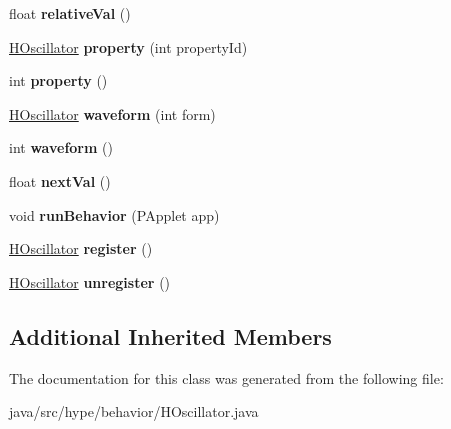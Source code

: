 \begin{DoxyCompactItemize}
\item 
\hypertarget{classhype_1_1behavior_1_1_h_oscillator_ace36b4ea82a7cf556430be8443673880}{float {\bfseries relative\-Val} ()}\label{classhype_1_1behavior_1_1_h_oscillator_ace36b4ea82a7cf556430be8443673880}

\item 
\hypertarget{classhype_1_1behavior_1_1_h_oscillator_a3c0d9ab739619f5b14dc8508711e7148}{\hyperlink{classhype_1_1behavior_1_1_h_oscillator}{H\-Oscillator} {\bfseries property} (int property\-Id)}\label{classhype_1_1behavior_1_1_h_oscillator_a3c0d9ab739619f5b14dc8508711e7148}

\item 
\hypertarget{classhype_1_1behavior_1_1_h_oscillator_a966798f379ac11c21d3190caa4a9571a}{int {\bfseries property} ()}\label{classhype_1_1behavior_1_1_h_oscillator_a966798f379ac11c21d3190caa4a9571a}

\item 
\hypertarget{classhype_1_1behavior_1_1_h_oscillator_a8bff5aa9e36d40ce17c07ea3ea34e9ed}{\hyperlink{classhype_1_1behavior_1_1_h_oscillator}{H\-Oscillator} {\bfseries waveform} (int form)}\label{classhype_1_1behavior_1_1_h_oscillator_a8bff5aa9e36d40ce17c07ea3ea34e9ed}

\item 
\hypertarget{classhype_1_1behavior_1_1_h_oscillator_ab86521034151a0c585058d590f4cad8b}{int {\bfseries waveform} ()}\label{classhype_1_1behavior_1_1_h_oscillator_ab86521034151a0c585058d590f4cad8b}

\item 
\hypertarget{classhype_1_1behavior_1_1_h_oscillator_a46363cacf632209deff97e3bd3f13969}{float {\bfseries next\-Val} ()}\label{classhype_1_1behavior_1_1_h_oscillator_a46363cacf632209deff97e3bd3f13969}

\item 
\hypertarget{classhype_1_1behavior_1_1_h_oscillator_acbaecb20d2aec5ffe62b4c3079a7207c}{void {\bfseries run\-Behavior} (P\-Applet app)}\label{classhype_1_1behavior_1_1_h_oscillator_acbaecb20d2aec5ffe62b4c3079a7207c}

\item 
\hypertarget{classhype_1_1behavior_1_1_h_oscillator_ac9f533b66ec5de4e06e20808e254c3de}{\hyperlink{classhype_1_1behavior_1_1_h_oscillator}{H\-Oscillator} {\bfseries register} ()}\label{classhype_1_1behavior_1_1_h_oscillator_ac9f533b66ec5de4e06e20808e254c3de}

\item 
\hypertarget{classhype_1_1behavior_1_1_h_oscillator_aa76d91f3a0d1c3c3955e0d15bbec7202}{\hyperlink{classhype_1_1behavior_1_1_h_oscillator}{H\-Oscillator} {\bfseries unregister} ()}\label{classhype_1_1behavior_1_1_h_oscillator_aa76d91f3a0d1c3c3955e0d15bbec7202}

\end{DoxyCompactItemize}
\subsection*{Additional Inherited Members}


The documentation for this class was generated from the following file\-:\begin{DoxyCompactItemize}
\item 
java/src/hype/behavior/H\-Oscillator.\-java\end{DoxyCompactItemize}
